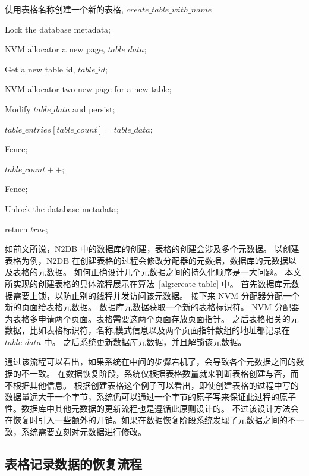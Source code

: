 \begin{algorithm}[ht]
    \caption{使用表格名称创建一个新的表格, $create\_table\_with\_name$}
    \label{alg:create-table}
    \BlankLine
    Lock the database metadata;


    NVM allocator a new page, $table\_data$;

    Get a new table id, $table\_id$;

    NVM allocator two new page for a new table;

    Modify $table\_data$ and persist;

    $table\_entries[table\_count] = table\_data$;

    Fence;

    $table\_count++$;

    Fence;

    Unlock the database metadata;

    return $true$;
\end{algorithm}

如前文所说，N2DB 中的数据库的创建，表格的创建会涉及多个元数据。
以创建表格为例，N2DB 在创建表格的过程会修改分配器的元数据，数据库的元数据以及表格的元数据。
如何正确设计几个元数据之间的持久化顺序是一大问题。
本文所实现的创建表格的具体流程展示在算法~\ref{alg:create-table} 中。
首先数据库元数据需要上锁，以防止别的线程并发访问该元数据。
接下来 NVM 分配器分配一个新的页面给表格元数据。
数据库元数据获取一个新的表格标识符。
NVM 分配器为表格多申请两个页面。表格需要这两个页面存放页面指针。
之后表格相关的元数据，比如表格标识符，名称,模式信息以及两个页面指针数组的地址都记录在 $table\_data$ 中。
之后系统更新数据库元数据，并且解锁该元数据。

通过该流程可以看出，如果系统在中间的步骤宕机了，会导致各个元数据之间的数据的不一致。
在数据恢复阶段，系统仅根据表格数量就来判断表格创建与否，而不根据其他信息。
根据创建表格这个例子可以看出，即使创建表格的过程中写的数据量远大于一个字节，系统仍可以通过一个字节的原子写来保证此过程的原子性。数据库中其他元数据的更新流程也是遵循此原则设计的。
不过该设计方法会在恢复时引入一些额外的开销。如果在数据恢复阶段系统发现了元数据之间的不一致，系统需要立刻对元数据进行修改。


\subsection{表格记录数据的恢复流程}
\label{ssec:record-data-recovery}

